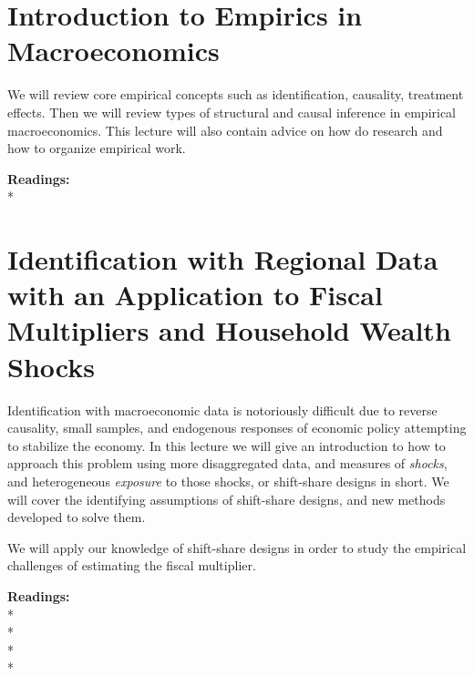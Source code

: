 \documentclass [12pt]{article}
\begin{document}




\section{Introduction to Empirics in Macroeconomics}

We will review core empirical concepts such as identification, causality, treatment effects. Then we will review types of structural and causal inference in empirical macroeconomics. This lecture will also contain advice on how do research and how to organize empirical work. 

\noindent\textbf{Readings:}\\
*

\section{Identification with Regional Data with an Application to Fiscal Multipliers and Household Wealth Shocks}

Identification with macroeconomic data is notoriously difficult due to reverse causality, small samples, and endogenous responses of economic policy attempting to stabilize the economy. In this lecture we will give an introduction to how to approach this problem using more disaggregated data, and measures of  \textit{shocks}, and heterogeneous \textit{exposure} to those shocks, or shift-share designs in short. We will cover the identifying assumptions of shift-share designs, and new methods developed to solve them. 

We will apply our knowledge of shift-share designs in order to study the empirical challenges of estimating the fiscal multiplier.

\noindent\textbf{Readings:}\\
*\\
*\\
*\\  
*\\
\\
\\
\\
\end{document}
